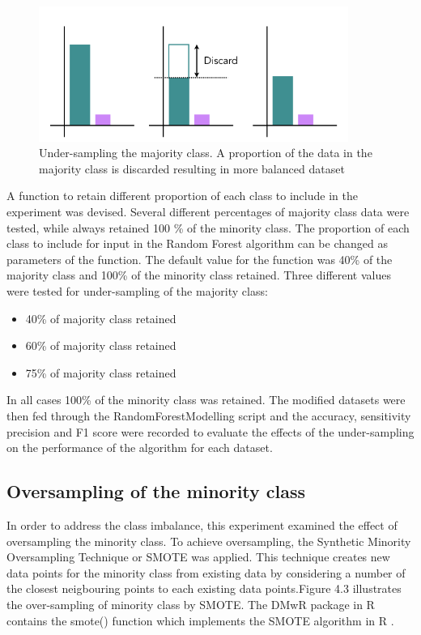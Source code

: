 \begin{figure}[!htbp]
    \centering
    \includegraphics[width=0.9\textwidth]{ThesisTemplate/usingLatex/chapter4Images/Figure2001.png}
    \caption{Under-sampling the majority class. A proportion of the data in the majority class is discarded resulting in more balanced dataset}
    \label{fig:my_label}
\end{figure}


A function to retain different proportion of each class to include in the experiment was devised. Several different percentages of majority class data were tested, while always retained 100 \% of the minority class.
The proportion of each class to include for input in the Random Forest algorithm can be changed as parameters of the function.
The default value for the function was 40\% of the majority class and 100\% of the minority class retained.\newline
Three different values were tested for under-sampling of the majority class:
\begin{itemize}
    \item 40\% of majority class retained
    \item 60\% of majority class retained
    \item 75\% of majority class retained
\end{itemize}

In all cases 100\% of the minority class was retained.\newline
The modified datasets were then fed through the RandomForestModelling script and the accuracy, sensitivity precision and F1 score were recorded to evaluate the effects of the under-sampling on the performance of the algorithm for each dataset.\newline



\subsection{Oversampling of the minority class}
In order to address the class imbalance, this experiment examined the effect of oversampling the minority class. To achieve oversampling, the Synthetic Minority Oversampling Technique or SMOTE \citep{Chawla:2002ty} was applied. \newline 
This technique creates new data points for the minority class from existing data by considering a number of the closest neigbouring points to each existing data points.Figure 4.3 illustrates the over-sampling of minority class by SMOTE. The DMwR package in R contains the smote() function which implements the SMOTE algorithm in R \citep{Anonymous:bPzTqa7x}.\newline

